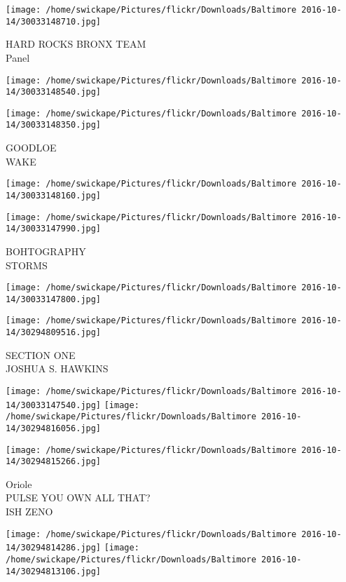 \documentclass[10pt,letterpaper]{article}
\begin{document}
\vspace{0.25in}
\texttt{[image: /home/swickape/Pictures/flickr/Downloads/Baltimore 2016-10-14/30033148710.jpg]}

HARD ROCKS BRONX TEAM\\
Panel
\pagebreak

\texttt{[image: /home/swickape/Pictures/flickr/Downloads/Baltimore 2016-10-14/30033148540.jpg]}

\vspace{0.25in}
\texttt{[image: /home/swickape/Pictures/flickr/Downloads/Baltimore 2016-10-14/30033148350.jpg]}

GOODLOE\\
WAKE
\pagebreak

\texttt{[image: /home/swickape/Pictures/flickr/Downloads/Baltimore 2016-10-14/30033148160.jpg]}

\vspace{0.25in}
\texttt{[image: /home/swickape/Pictures/flickr/Downloads/Baltimore 2016-10-14/30033147990.jpg]}

BOHTOGRAPHY\\
STORMS
\pagebreak

\texttt{[image: /home/swickape/Pictures/flickr/Downloads/Baltimore 2016-10-14/30033147800.jpg]}

\vspace{0.25in}
\texttt{[image: /home/swickape/Pictures/flickr/Downloads/Baltimore 2016-10-14/30294809516.jpg]}

SECTION ONE\\
JOSHUA S. HAWKINS
\pagebreak

\texttt{[image: /home/swickape/Pictures/flickr/Downloads/Baltimore 2016-10-14/30033147540.jpg]}
\texttt{[image: /home/swickape/Pictures/flickr/Downloads/Baltimore 2016-10-14/30294816056.jpg]}

\vspace{0.25in}
\texttt{[image: /home/swickape/Pictures/flickr/Downloads/Baltimore 2016-10-14/30294815266.jpg]}

Oriole\\
PULSE YOU OWN ALL THAT?\\
ISH ZENO
\pagebreak

\texttt{[image: /home/swickape/Pictures/flickr/Downloads/Baltimore 2016-10-14/30294814286.jpg]}
\texttt{[image: /home/swickape/Pictures/flickr/Downloads/Baltimore 2016-10-14/30294813106.jpg]}
\end{document}
